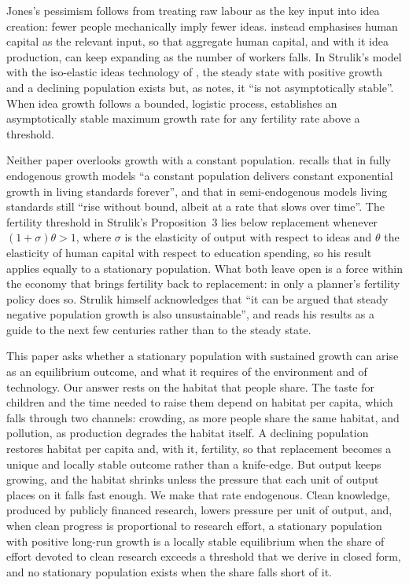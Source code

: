 \documentclass[11pt]{article}
\begin{document}
Jones's pessimism follows from treating raw labour as the key input into idea creation: fewer people
mechanically imply fewer ideas. \citet{STRULIK2024104943} instead emphasises human capital as the
relevant input, so that aggregate human capital, and with it idea production, can keep expanding as
the number of workers falls. In Strulik's model with the iso-elastic ideas technology of
\citet{jones22}, the steady state with positive growth and a declining population exists but, as
\citet[Section~2.5]{STRULIK2024104943} notes, it ``is not asymptotically stable''. When idea growth
follows a bounded, logistic process, \citet[Proposition~3]{STRULIK2024104943} establishes an
asymptotically stable maximum growth rate for any fertility rate above a threshold.

Neither paper overlooks growth with a constant population. \citet[pp.~3493--3494]{jones22} recalls that
in fully endogenous growth models ``a constant population delivers constant exponential growth in living
standards forever'', and that in semi-endogenous models living standards still ``rise without bound,
albeit at a rate that slows over time''. The fertility threshold in Strulik's Proposition~3 lies below
replacement whenever $(1+\sigma)\theta>1$, where $\sigma$ is the elasticity of output with respect to
ideas and $\theta$ the elasticity of human capital with respect to education spending, so his result
applies equally to a stationary population. What
both leave open is a force within the economy that brings fertility back to replacement: in
\citet{jones22} only a planner's fertility policy does so. Strulik himself
acknowledges that ``it can be argued that steady negative population growth is also unsustainable'', and
reads his results as a guide to the next few centuries rather than to the steady state.

This paper asks whether a stationary population with sustained growth can arise as an equilibrium
outcome, and what it requires of the environment and of technology. Our answer rests on the habitat
that people share. The taste for children and the time needed to raise them depend on habitat per
capita, which falls through two channels: crowding, as more people share the same habitat, and
pollution, as production degrades the habitat itself. A declining population restores habitat per
capita and, with it, fertility, so that replacement becomes a unique and locally stable outcome rather
than a knife-edge. But output keeps growing, and the habitat shrinks unless the pressure that each unit
of output places on it falls fast enough. We make that rate endogenous. Clean knowledge, produced by
publicly financed research, lowers pressure per unit of output, and, when clean progress is proportional
to research effort, a stationary population with positive long-run growth is a locally stable
equilibrium when the share of effort devoted to clean research exceeds a threshold that we derive in
closed form, and no stationary population exists when the share falls short of it.
\end{document}
